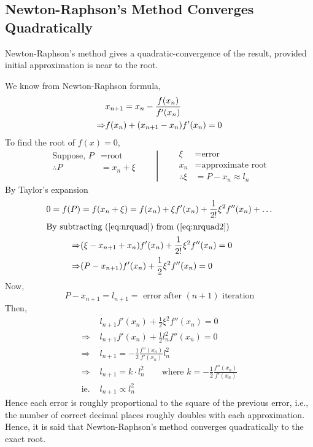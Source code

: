 \documentclass[12pt,class=book,crop=false]{standalone}
\begin{document}
\subsection{Newton-Raphson's Method Converges Quadratically}
Newton-Raphson's method gives a quadratic-convergence of the result, provided initial approximation is near to the root.

We know from Newton-Raphson formula,
\begin{align}
                & x_{n+1}=x_n-\frac{f(x_n)}{f'(x_n)}\notag        \\
    \Rightarrow & f(x_n)+(x_{n+1}-x_n)f'(x_n)=0 \label{eq:nrquad}
\end{align}
To find the root of \( f(x)=0 \),
\[\left.{\begin{aligned}
        \text{Suppose, }P & =\text{root} \\
        \therefore P      & =x_n+\xi     \\
                          &              \\
    \end{aligned}}\qquad\right\vert\qquad{\begin{aligned}
            \xi            & = \text{error}            \\
            x_n            & = \text{approximate root} \\
            \therefore \xi & =P-x_n\approx l_n
        \end{aligned}}\]
By Taylor's expansion
\begin{align}%
    0=f(P)      & =f(x_n+\xi)= f(x_n)+\xi f'(x_n)+\frac{1}{2!}\xi^2 f''(x_n)+\dots \label{eq:nrquad2} \\
    \intertext{By subtracting (\ref{eq:nrquad}) from (\ref{eq:nrquad2})}
    \Rightarrow & (\xi-x_{n+1}+x_n)f'(x_n)+\frac{1}{2!}\xi^2 f''(x_n)=0\notag                         \\
    \Rightarrow & (P-x_{n+1})f'(x_n)+\frac{1}{2}\xi^2 f''(x_n)=0\notag
\end{align}
Now,
\[
    P-x_{n+1}=l_{n+1}=\text{ error after }(n+1)\text{ iteration}
\]
Then,
\begin{align*}
                 & l_{n+1}f'(x_n)+\frac{1}{2}\xi^2 f''(x_n)=0                                    \\
    \Rightarrow  & l_{n+1}f'(x_n)+\frac{1}{2}l_n^2 f''(x_n)=0                                    \\
    \Rightarrow  & l_{n+1}=-\frac{1}{2}\frac{f''(x_n)}{f'(x_n)}l_n^2                             \\
    \Rightarrow  & l_{n+1}=k\cdot l_n^2\qquad\text{where }k=-\frac{1}{2}\frac{f''(x_n)}{f'(x_n)} \\
    \text{ie.\ } & l_{n+1}\propto l_n^2
\end{align*}
Hence each error is roughly proportional to the square of the previous error, i.e., the number of correct decimal places roughly doubles with each approximation. Hence, it is said that Newton-Raphson's method converges quadratically to the exact root.
\newpage
\end{document}
